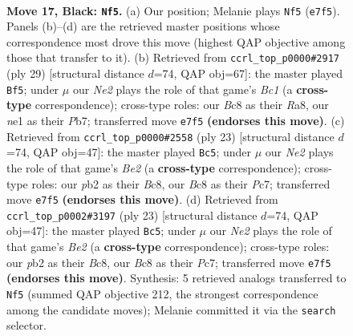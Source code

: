\documentclass[11pt]{article}
\begin{document}
\clearpage

\begin{figure}[p]\centering
\begin{subfigure}{0.46\textwidth}\centering
\resizebox{\linewidth}{!}{%
\newchessgame
\chessboard[
  setfen={nrb2rk1/p3npbp/3q4/1pp1p2P/8/3PP3/PP3PB1/RNBQNRK1 b - - 1 17},
  showmover=false,
  pgfstyle=straightmove, color=movearrow, markmove={e7-f5}
]}
\caption{}
\end{subfigure}\hfill
\begin{subfigure}{0.46\textwidth}\centering
\resizebox{\linewidth}{!}{%
\newchessgame
\chessboard[
  setfen={r1bq1rk1/pp3pbp/6p1/2pPn3/Pn2N3/N5PP/1P3PB1/R1BQ1RK1 b - - 2 15},
  showmover=false,
  pgfstyle=straightmove, color=movearrow, markmove={c8-f5}
]}
\caption{}
\end{subfigure}
\\[4pt]
\begin{subfigure}{0.46\textwidth}\centering
\resizebox{\linewidth}{!}{%
\newchessgame
\chessboard[
  setfen={r1bq1rk1/2p1bppp/p4n2/4p3/Pp2P3/1B6/1PPN1PPP/R1BQR1K1 b - - 1 12},
  showmover=false,
  pgfstyle=straightmove, color=movearrow, markmove={e7-c5}
]}
\caption{}
\end{subfigure}\hfill
\begin{subfigure}{0.46\textwidth}\centering
\resizebox{\linewidth}{!}{%
\newchessgame
\chessboard[
  setfen={r1bq1rk1/2p1bppp/p4n2/4p3/Pp2P3/1B6/1PPN1PPP/R1BQR1K1 b - - 1 12},
  showmover=false,
  pgfstyle=straightmove, color=movearrow, markmove={e7-c5}
]}
\caption{}
\end{subfigure}
\caption{\textbf{Move 17, Black: \texttt{Nf5}.} (a) Our position; Melanie plays \texttt{Nf5} (\texttt{e7f5}). Panels (b)--(d) are the retrieved master positions whose correspondence most drove this move (highest QAP objective among those that transfer to it). (b) Retrieved from \texttt{ccrl\_top\_p0000\#2917} (ply 29) [structural distance $d$=74, QAP obj=67]: the master played \texttt{Bf5}; under $\mu$ our \emph{Ne2} plays the role of that game's \emph{Bc1} (a \textbf{cross-type} correspondence); cross-type roles: our \emph{B}c8 as their \emph{R}a8, our \emph{n}e1 as their \emph{P}b7; transferred move \texttt{e7f5} \textbf{(endorses this move)}. (c) Retrieved from \texttt{ccrl\_top\_p0000\#2558} (ply 23) [structural distance $d$=74, QAP obj=47]: the master played \texttt{Bc5}; under $\mu$ our \emph{Ne2} plays the role of that game's \emph{Be2} (a \textbf{cross-type} correspondence); cross-type roles: our \emph{p}b2 as their \emph{B}c8, our \emph{B}c8 as their \emph{P}c7; transferred move \texttt{e7f5} \textbf{(endorses this move)}. (d) Retrieved from \texttt{ccrl\_top\_p0002\#3197} (ply 23) [structural distance $d$=74, QAP obj=47]: the master played \texttt{Bc5}; under $\mu$ our \emph{Ne2} plays the role of that game's \emph{Be2} (a \textbf{cross-type} correspondence); cross-type roles: our \emph{p}b2 as their \emph{B}c8, our \emph{B}c8 as their \emph{P}c7; transferred move \texttt{e7f5} \textbf{(endorses this move)}. Synthesis: 5 retrieved analogs transferred to \texttt{Nf5} (summed QAP objective 212, the strongest correspondence among the candidate moves); Melanie committed it via the \texttt{search} selector.}
\label{fig:thought-m33}
\end{figure}
\end{document}
